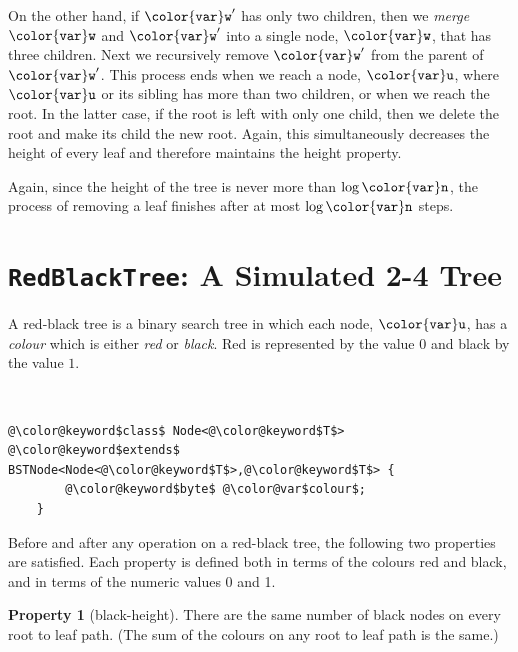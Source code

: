 \documentclass[10pt]{book}
\newcommand{\seclabel}[1]{\label{sec:#1}}
\theoremstyle{plain}
\theoremstyle{definition}
\newtheorem{prp}{Property}[chapter]
\begin{document}
On the other hand, if \ensuremath{\mathtt{{\color{var}w}'}} has only two children, then we \emph{merge}
%
\ensuremath{\mathtt{{\color{var}w}}} and \ensuremath{\mathtt{{\color{var}w}'}} into a single node, \ensuremath{\mathtt{{\color{var}w}}}, that has three children.  Next we
recursively remove \ensuremath{\mathtt{{\color{var}w}'}} from the parent of \ensuremath{\mathtt{{\color{var}w}'}}.  This process ends
when we reach a node, \ensuremath{\mathtt{{\color{var}u}}}, where \ensuremath{\mathtt{{\color{var}u}}} or its sibling has more than two
children, or when we reach the root.  In the latter case, if the root
is left with only one child, then we delete the root and make its child
the new root.  Again, this simultaneously decreases the height of every
leaf and therefore maintains the height property.

Again, since the height of the tree is never more than $\log \ensuremath{\mathtt{{\color{var}n}}}$,
the process of removing a leaf finishes after at most $\log \ensuremath{\mathtt{{\color{var}n}}}$ steps.

\section{\texttt{RedBlackTree}: A Simulated 2-4 Tree}
\seclabel{redblacktree}

A red-black tree is a binary search tree in which each node, \ensuremath{\mathtt{{\color{var}u}}},
has a \emph{colour}
%
which is either \emph{red} or \emph{black}.  Red is
represented by the value $0$ and black by the value $1$.
%
%


 \ \vspace{.5ex}\begin{Verbatim}[gobble=1,tabsize=2,frame=single,framerule=1.2pt,commandchars=\\@\$,label=\texttt{RedBlackTree},labelposition=topline]
	@\color@keyword$class$ Node<@\color@keyword$T$> @\color@keyword$extends$ BSTNode<Node<@\color@keyword$T$>,@\color@keyword$T$> {
		@\color@keyword$byte$ @\color@var$colour$;
	}
\end{Verbatim}


Before and after any operation on a red-black tree, the following two
properties are satisfied. Each property is defined both in terms of the
colours red and black, and in terms of the numeric values 0 and 1.
\begin{prp}[black-height]
  There are the same number of black nodes on every root to leaf
  path. (The sum of the colours on any root to leaf path is the same.)
\end{prp}
\end{document}

